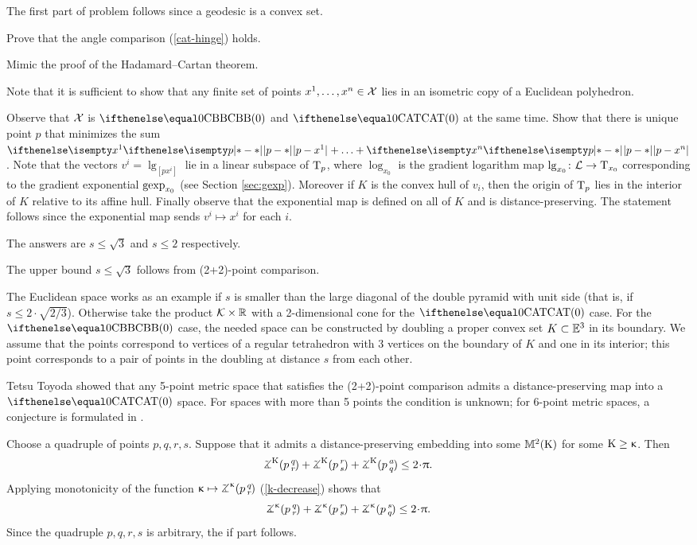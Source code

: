 The first part of problem follows since a geodesic is a convex set.

 Prove that the angle comparison (\ref{cat-hinge}) holds.

 Mimic the proof of the Hadamard--Cartan theorem.

Note that it is sufficient to show that any finite set of points $x^1,\dots,x^n\in\spc{X}$ lies in an isometric copy of a Euclidean polyhedron.

Observe that $\mathcal{X}$ is $\Alex0$ and $\CAT0$ at the same time.
Show that there is unique point $p$ that minimizes the sum $\dist{p}{x^1}{}+\dots+\dist{p}{x^n}{}$.
Note that the vectors $v^i=\lg_{[{p}{x^i}]}$ lie in a linear subspace of $\text{\rm T}_p$, where $\log_{x_0}$  is the gradient logarithm map $\log_{x_0}\:\spc{L}\to\T_{x_0}$ corresponding to the gradient exponential $\mathop{\rm gexp}\nolimits_{x_0}$ (see Section \ref{sec:gexp}).
Moreover if $K$ is the convex hull of $v_i$, then the origin of $\text{\rm T}_p$ lies in the interior of $K$ relative to its affine hull.
Finally observe that the exponential map is defined on all of $K$ and is distance-preserving.
The statement follows since the exponential map sends $v^i\mapsto x^i$ for each $i$.

The answers are $s\le \sqrt3$ and $s\le 2$ respectively.

The upper bound $s\le \sqrt3$ follows from (2+2)-point comparison.

The Euclidean space works as an example if $s$ is smaller than the large diagonal of the double pyramid with unit side (that is, if $s\le 2\cdot\sqrt{2/3}$).
Otherwise take the product $\spc{K}\times \RR$ with a 2-dimensional cone for the $\CAT0$ case.
For the $\Alex0$ case, the needed space can be constructed by doubling  a proper convex set $K\subset\EE^3$ in its boundary.
We assume that the points correspond to vertices of a regular tetrahedron with 3 vertices on the boundary of $K$ and one  in its interior; this point corresponds to a pair of points in the doubling at distance $s$ from each other.

Tetsu Toyoda \cite{toyoda} showed that any 5-point metric space that satisfies the (2+2)-point comparison admits a distance-preserving map into a $\CAT0$ space.
For spaces with more than 5 points the condition is unknown;
for 6-point metric spaces, a conjecture is formulated in \cite{lebedeva-petrunin-zolotov}.

Choose a quadruple of points $p,q,r,s$. 
Suppose that it admits a distance-preserving embedding into some $\mathbb{M}_{{}}^{2}({\mathrm{K}})$ for some $\Kappa\ge \kappa$.
Then 
\[\angk\Kappa p{q}{r}
+\angk\Kappa p{r}{s}
+\angk\Kappa p{a}{q}\le 2\cdot\pi.\]
Applying monotonicity of the function $\kappa\mapsto\angk\kappa p{q}{r}$ (\ref{k-decrease}) shows  that
\[\angk\kappa p{q}{r}
+\angk\kappa p{r}{s}
+\angk\kappa p{s}{q}\le 2\cdot\pi.\]
Since the quadruple $p,q,r,s$ is arbitrary, the if part follows.

